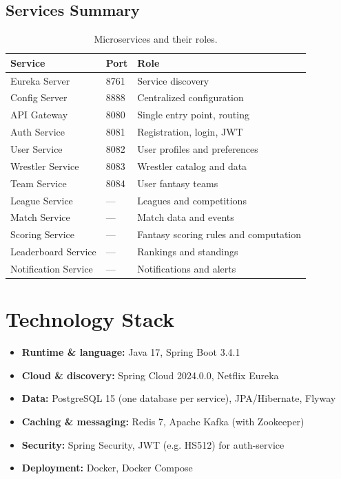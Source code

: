 \documentclass[11pt,a4paper]{article}
\begin{document}
\subsection{Services Summary}
\begin{table}[h]
\centering
\begin{tabular}{@{}lll@{}}
\toprule
\textbf{Service}        & \textbf{Port} & \textbf{Role} \\
\midrule
Eureka Server           & 8761 & Service discovery \\
Config Server           & 8888 & Centralized configuration \\
API Gateway             & 8080 & Single entry point, routing \\
Auth Service            & 8081 & Registration, login, JWT \\
User Service            & 8082 & User profiles and preferences \\
Wrestler Service        & 8083 & Wrestler catalog and data \\
Team Service            & 8084 & User fantasy teams \\
League Service          & ---  & Leagues and competitions \\
Match Service           & ---  & Match data and events \\
Scoring Service         & ---  & Fantasy scoring rules and computation \\
Leaderboard Service     & ---  & Rankings and standings \\
Notification Service    & ---  & Notifications and alerts \\
\bottomrule
\end{tabular}
\caption{Microservices and their roles.}
\label{tab:services}
\end{table}

\section{Technology Stack}
\begin{itemize}
\item \textbf{Runtime \& language:} Java 17, Spring Boot 3.4.1
\item \textbf{Cloud \& discovery:} Spring Cloud 2024.0.0, Netflix Eureka
\item \textbf{Data:} PostgreSQL 15 (one database per service), JPA/Hibernate, Flyway
\item \textbf{Caching \& messaging:} Redis 7, Apache Kafka (with Zookeeper)
\item \textbf{Security:} Spring Security, JWT (e.g. HS512) for auth-service
\item \textbf{Deployment:} Docker, Docker Compose
\end{itemize}
\end{document}
